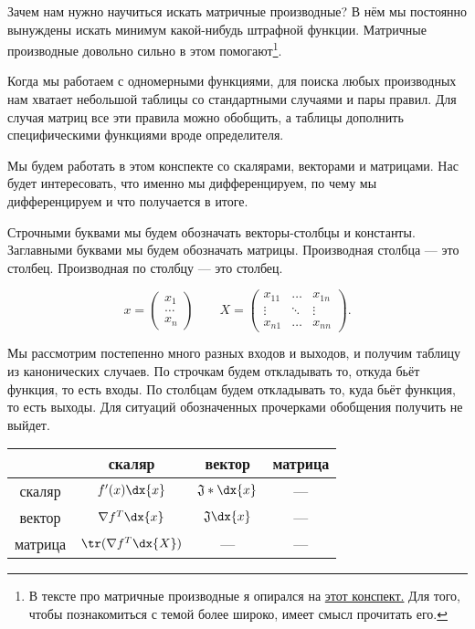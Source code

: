 \begin{sol}


Зачем нам нужно научиться искать матричные производные?  В нём мы постоянно вынуждены искать минимум какой-нибудь штрафной функции. Матричные производные довольно сильно в этом помогают\footnote{В тексте про матричные производные я опирался на \href{http://www.machinelearning.ru/wiki/images/5/50/MOMO17_Seminar2.pdf}{этот конспект.} Для того, чтобы познакомиться с темой более широко, имеет смысл прочитать его.}. 

Когда мы работаем с одномерными функциями, для поиска любых производных нам хватает небольшой таблицы со стандартными случаями и пары правил. Для случая матриц все эти правила можно обобщить, а таблицы дополнить специфическими функциями вроде определителя. 

Мы будем работать в этом конспекте со скалярами, векторами и матрицами. Нас будет интересовать, что именно мы дифференцируем, по чему мы дифференцируем и что получается в итоге.  

Строчными буквами мы будем обозначать векторы-столбцы и константы. Заглавными буквами мы будем обозначать матрицы. Производная столбца --- это столбец. Производная по столбцу --- это столбец. 

\[
x = \begin{pmatrix}x_1 \\ \ldots \\ x_n \end{pmatrix} \qquad X = \begin{pmatrix}x_{11} & \ldots & x_{1n} \\ \vdots & \ddots & \vdots \\ x_{n1} & \ldots & x_{nn}  \end{pmatrix}.
\]

Мы рассмотрим постепенно много разных входов и выходов,  и получим таблицу из канонических случаев. По строчкам будем откладывать то, откуда бьёт функция, то есть входы. По столбцам будем откладывать то, куда бьёт функция, то есть выходы. Для ситуаций обозначенных прочерками обобщения получить не выйдет. 

\begin{center} 
    \begin{tabular}{|c|c|c|c|}
    \hline
        & скаляр & вектор & матрица \\
    \hline 
    скаляр & $f'(x) \dx{x}$  &  $\mathfrak{J} * \dx{x}$  & ---          \\
    \hline
    вектор & $\nabla f^T \dx{x}$    &   $\mathfrak{J} \dx{x}$     &  ---        \\
    \hline
    матрица & $\tr(\nabla f^T \dx{X})$    &    ---    & ---        \\
    \hline
    \end{tabular}
\end{center} 


\end{sol}
